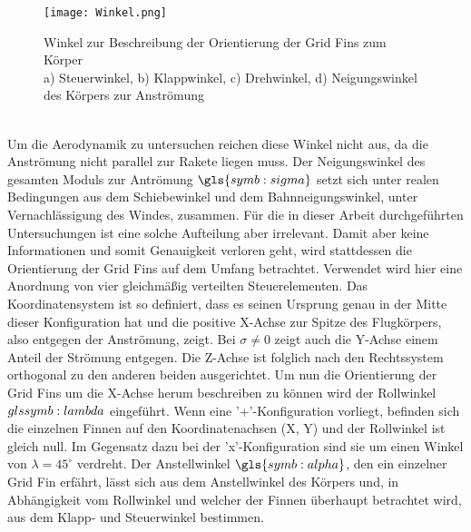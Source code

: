 \begin{figure}[h]
	\centering
	\texttt{[image: Winkel.png]}
	\caption{Winkel zur Beschreibung der Orientierung der Grid Fins zum Körper\\a) Steuerwinkel, b) Klappwinkel, c) Drehwinkel, d) Neigungswinkel des Körpers zur Anströmung}
	\label{abb_winkel}
\end{figure}\\
Um die Aerodynamik zu untersuchen reichen diese Winkel nicht aus, da die Anströmung nicht parallel zur Rakete liegen muss. Der Neigungswinkel des gesamten Moduls zur Antrömung $\gls{symb:sigma}$ setzt sich unter realen Bedingungen aus dem Schiebewinkel und dem Bahnneigungswinkel, unter Vernachlässigung des Windes, zusammen. Für die in dieser Arbeit durchgeführten Untersuchungen ist eine solche Aufteilung aber irrelevant. Damit aber keine Informationen und somit Genauigkeit verloren geht, wird stattdessen die Orientierung der Grid Fins auf dem Umfang betrachtet. Verwendet wird hier eine Anordnung von vier gleichmäßig verteilten Steuerelementen. Das Koordinatensystem ist so definiert, dass es seinen Ursprung genau in der Mitte dieser Konfiguration hat und die positive X-Achse zur Spitze des Flugkörpers, also entgegen der Anströmung, zeigt. Bei $\sigma \neq 0$ zeigt auch die Y-Achse einem Anteil der Strömung entgegen. Die Z-Achse ist folglich nach den Rechtssystem orthogonal zu den anderen beiden ausgerichtet. Um nun die Orientierung der Grid Fins um die X-Achse herum beschreiben zu können wird der Rollwinkel $\\gls{symb:lambda}$ eingeführt. Wenn eine '+'-Konfiguration vorliegt, befinden sich die einzelnen Finnen auf den Koordinatenachsen (X, Y) und der Rollwinkel ist gleich null. Im Gegensatz dazu bei der 'x'-Konfiguration sind sie um einen Winkel von $\lambda = 45^\circ$ verdreht. Der Anstellwinkel $\gls{symb:alpha}$, den ein einzelner Grid Fin erfährt, lässt sich aus dem Anstellwinkel des Körpers und, in Abhängigkeit vom Rollwinkel und welcher der Finnen überhaupt betrachtet wird, aus dem Klapp- und Steuerwinkel bestimmen.



